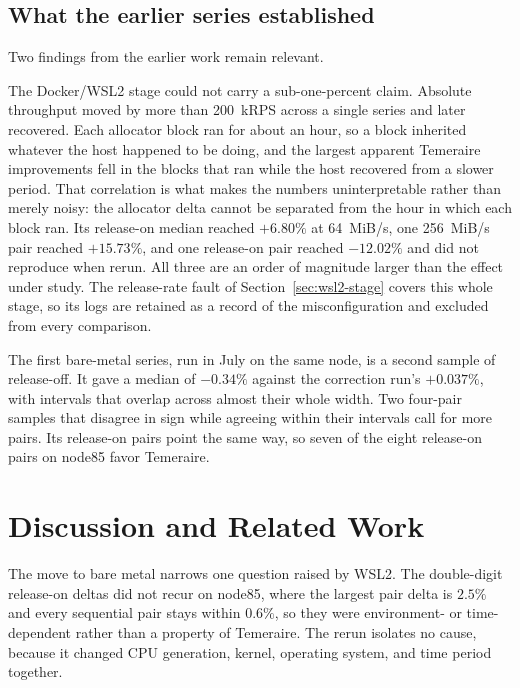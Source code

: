 \documentclass[sigconf]{acmart}
\begin{document}
\subsection{What the earlier series established}
\label{sec:earlier-series}

Two findings from the earlier work remain relevant.

The Docker/WSL2 stage could not carry a sub-one-percent claim. Absolute
throughput moved by more than 200~kRPS across a single series and later
recovered. Each allocator block ran for about an hour, so a block inherited
whatever the host happened to be doing, and the largest apparent Temeraire
improvements fell in the blocks that ran while the host recovered from a
slower period. That correlation is what
makes the numbers uninterpretable rather than merely noisy: the allocator
delta cannot be separated from the hour in which each block ran. Its release-on median reached $+6.80\%$ at 64~MiB/s, one 256~MiB/s pair reached
$+15.73\%$, and one release-on pair reached $-12.02\%$ and did not reproduce
when rerun. All three are an order of magnitude larger than the effect under
study. The release-rate fault of Section~\ref{sec:wsl2-stage} covers this
whole stage, so its logs are retained as a record of the misconfiguration and
excluded from every comparison.

The first bare-metal series, run in July on the same node, is a second sample
of release-off. It gave a median of $-0.34\%$ against the correction run's
$+0.037\%$, with intervals that overlap across almost their whole width. Two
four-pair samples that disagree in sign while agreeing within their intervals
call for more pairs. Its release-on pairs point the same way, so seven of the
eight release-on pairs on node85 favor Temeraire.

\section{Discussion and Related Work}
\label{sec:discussion-related}



The move to bare metal narrows one question raised by WSL2. The double-digit release-on deltas did not recur on node85, where the largest
pair delta is $2.5\%$ and every sequential pair stays within $0.6\%$, so they
were environment- or time-dependent rather than a property of Temeraire. The rerun isolates no cause, because it changed CPU generation, kernel,
operating system, and time period together.
\end{document}
